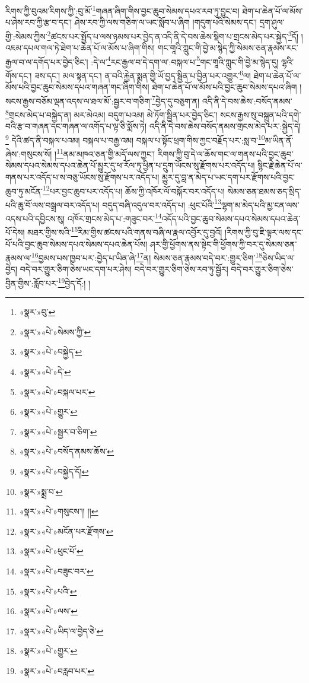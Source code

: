 རིགས་ཀྱི་བུའམ་རིགས་ཀྱི་:བུ་མོ་\footnote{«སྣར་»བུ་}གཞན་ཞིག་གིས་བྱང་ཆུབ་སེམས་དཔའ་རབ་ཏུ་བྱུང་བ། ཐེག་པ་ཆེན་པོ་ལ་མོས་པ་ཤེས་རབ་ཀྱི་རྩ་བ་དང་། ཤེས་རབ་ཀྱི་ལས་གཅིག་ལ་ཡང་སློབ་པ་ཞིག །གདུག་པའི་སེམས་དང་། དྲག་ཤུལ་གྱི་:སེམས་ཀྱིས་\footnote{«སྣར་»«པེ་»སེམས་ཀྱི་}ཚངས་པར་སྤྱོད་པ་ལས་ཉམས་པར་བྱེད་ན་འདི་ནི་དེ་བས་ཆེས་སྡིག་པ་གྲངས་མེད་པར་སྐྱེད་\footnote{«སྣར་»«པེ་»བསྐྱེད་}དོ། །འཇམ་དཔལ་གལ་ཏེ་ཐེག་པ་ཆེན་པོ་ལ་མོས་པ་ཞིག་གིས། གང་གཱའི་ཀླུང་གི་བྱེ་མ་སྙེད་ཀྱི་སེམས་ཅན་རྣམས་རང་རྒྱལ་བ་ལ་དགོད་པར་བྱེད་ཅིང་། :དེ་ལ་\footnote{«སྣར་»«པེ་»དེ་}རང་རྒྱལ་བ་དེ་དག་ལ་:བསྐལ་པ་\footnote{«སྣར་»«པེ་»བསྐལ་པར་}གང་གཱའི་ཀླུང་གི་བྱེ་མ་སྙེད་དུ། ལྷའི་གོས་དང་། ཟས་དང་། མལ་སྟན་དང་། ན་བའི་རྐྱེན་སྨན་གྱི་ཡོ་བྱད་སྦྱིན་པ་བྱིན་པར་འགྱུར་\footnote{«སྣར་»«པེ་»གྱུར་}ལ། ཐེག་པ་ཆེན་པོ་ལ་མོས་པའི་བྱང་ཆུབ་སེམས་དཔའ་གཞན་གང་ཞིག་གིས། ཐེག་པ་ཆེན་པོ་ལ་མོས་པའི་བྱང་ཆུབ་སེམས་དཔའ་ཞིག །སངས་རྒྱས་བཅོམ་ལྡན་འདས་ལ་ཐལ་མོ་:སྦྱར་བ་གཅིག་\footnote{«སྣར་»«པེ་»སྦྱར་བ་ཅིག་}བྱེད་དུ་བཅུག་ན། འདི་ནི་དེ་བས་ཆེས་:བསོད་ནམས་\footnote{«སྣར་»«པེ་»བསོད་ནམས་ཆོས་}གྲངས་མེད་པ་བསྐྱེད་ན། མར་མེའམ། བདུག་པའམ། མེ་ཏོག་སྦྱིན་པར་བྱེད་ཅིང་། སངས་རྒྱས་སུ་བསྐྲུན་པའི་དགེ་བའི་རྩ་བ་གཞན་དང་གཞན་ལ་འགོད་པ་ལྟ་ཅི་སྨོས་ཏེ། འདི་ནི་དེ་བས་ཆེས་བསོད་ནམས་གྲངས་མེད་པར་:སྐྱེད་དེ།\footnote{«སྣར་»«པེ་»བསྐྱེད་དོ།} དེའི་ཚད་ནི་བསྐལ་པའམ། བསྐལ་པ་བརྒྱ་འམ། བསྐལ་པ་སྟོང་ཕྲག་གིས་ཀྱང་བརྗོད་པར་:སླ་བ་\footnote{«སྣར་»སྨྲ་བ་}མ་ཡིན་ནོ་ཞེས་:གསུངས་སོ། །\footnote{«སྣར་»«པེ་»གསུངས་།། །།}ནམ་མཁའ་ཅན་གྱི་མདོ་ལས་ཀྱང་། རིགས་ཀྱི་བུ་དེ་ལ་ཆོས་གང་ལ་གནས་པའི་བྱང་ཆུབ་སེམས་དཔའ་སེམས་དཔའ་ཆེན་པོ་མྱུར་དུ་ཕ་རོལ་ཏུ་ཕྱིན་པ་དྲུག་ཡོངས་སུ་རྫོགས་པར་འདོད་པ། སྙིང་རྗེ་ཆེན་པོ་ལ་གནས་པར་འདོད་པ་ས་བཅུ་ཡོངས་སུ་རྫོགས་པར་འདོད་པ། མྱུར་དུ་བླ་ན་མེད་པ་ཡང་དག་པར་རྫོགས་པའི་བྱང་ཆུབ་ཏུ་མངོན་\footnote{«སྣར་»«པེ་»མངོན་པར་རྫོགས་}པར་བྱང་ཆུབ་པར་འདོད་པ། ཆོས་ཀྱི་འཁོར་ལོ་བསྐོར་བར་འདོད་པ། སེམས་ཅན་ཐམས་ཅད་སྲིད་པའི་ཆུ་བོ་ལས་བསྒྲལ་བར་འདོད་པ། བདུད་བཞི་འདུལ་བར་འདོད་པ། :ཕུང་པོའི་\footnote{«སྣར་»«པེ་»ཕུང་པོ་}ལྷག་མ་མེད་པའི་མྱ་ངན་ལས་འདས་པའི་དབྱིངས་སུ། འཁོར་གྲངས་མེད་པ་:གཟུང་བར་\footnote{«སྣར་»«པེ་»བཟུང་བར་}འདོད་པའི་བྱང་ཆུབ་སེམས་དཔའ་སེམས་དཔའ་ཆེན་པོ་དེས། མཐར་གྱིས་སའི་\footnote{«སྣར་»«པེ་»པའི་}རིམ་གྱིས་ཚངས་པའི་གནས་བཞི་ལ་རྣལ་འབྱོར་དུ་བྱའོ། །རིགས་ཀྱི་བུ་ཇི་ལྟར་ལས་དང་པོ་པའི་བྱང་ཆུབ་སེམས་དཔའ་སེམས་དཔའ་ཆེན་པོས། ཤར་གྱི་ཕྱོགས་ནས་སྟེང་གི་ཕྱོགས་ཀྱི་བར་དུ་སེམས་ཅན་རྣམས་ལ་\footnote{«སྣར་»«པེ་»ལས་}བྱམས་པས་ཁྱབ་པར་:བྱེད་པ་ཡིན་ཞེ་\footnote{«སྣར་»«པེ་»ཡིད་ལ་བྱེད་ཅེ་}ན། སེམས་ཅན་རྣམས་བདེ་བར་:གྱུར་ཅིག་\footnote{«སྣར་»«པེ་»གྱུར་}ཅེས་ཡིད་ལ་བྱེད། བདེ་བར་གྱུར་ཅིག་ཅེས་ཡང་དག་པར་ཤེས། བདེ་བར་གྱུར་ཅིག་ཅེས་རབ་ཏུ་སྦྱོར། བདེ་བར་གྱུར་ཅིག་ཅེས་བྱིན་གྱིས་:རློབ་པར་\footnote{«སྣར་»«པེ་»བརླབ་པར་}བྱེད་དོ:། །
